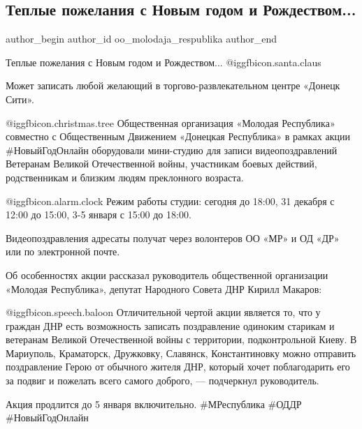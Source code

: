  
 
 
 
 
\subsection{Теплые пожелания с Новым годом и Рождеством...}
\label{sec:30_12_2021.vk.oo_molodaja_respublika.1.novyj_god_rozhdestvo}

\ifcmt
 author_begin
   author_id oo_molodaja_respublika
 author_end
\fi

Теплые пожелания с Новым годом и Рождеством... @igg{fbicon.santa.claus} 

Может записать любой желающий в торгово-развлекательном центре «Донецк Сити».

@igg{fbicon.christmas.tree} Общественная организация «Молодая Республика»
совместно с Общественным Движением «Донецкая Республика» в рамках акции
\#НовыйГодОнлайн оборудовали мини-студию для записи видеопоздравлений Ветеранам
Великой Отечественной войны, участникам боевых действий, родственникам и
близким людям преклонного возраста.


 @igg{fbicon.alarm.clock}  Режим работы студии: сегодня до 18:00, 31 декабря с 12:00 до 15:00, 3-5
января с 15:00 до 18:00.

Видеопоздравления адресаты получат через волонтеров ОО «МР» и ОД «ДР» или по
электронной почте.


Об особенностях акции рассказал руководитель общественной организации «Молодая
Республика», депутат Народного Совета ДНР Кирилл Макаров:

 @igg{fbicon.speech.baloon}  Отличительной чертой акции является то, что у граждан ДНР есть возможность
записать поздравление одиноким старикам и ветеранам Великой Отечественной войны
с территории, подконтрольной Киеву. В Мариуполь, Краматорск, Дружковку,
Славянск, Константиновку можно отправить поздравление Герою от обычного жителя
ДНР, который хочет поблагодарить его за подвиг и пожелать всего самого доброго,
— подчеркнул руководитель. 


Акция продлится до 5 января включительно. \#МРеспублика \#ОДДР \#НовыйГодОнлайн
